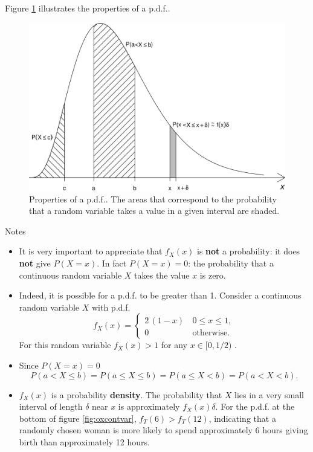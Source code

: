 \documentclass[
  11pt,
  british,
  openany, a4paper]{book}
\providecommand{\tightlist}{%
  \setlength{\itemsep}{0pt}\setlength{\parskip}{0pt}}
\begin{document}
Figure \ref{fig:pdfshady} illustrates the properties of a p.d.f..

\begin{figure}

{\centering \includegraphics[width=0.75\linewidth]{images/pdf_shady} 

}

\caption{Properties of a p.d.f.. The areas that correspond to the probability that a random variable takes a value in a given interval are shaded.}\label{fig:pdfshady}
\end{figure}

Notes

\begin{itemize}
\tightlist
\item
  It is very important to appreciate that \(f_X(x)\) is \textbf{not} a probability: it does \textbf{not} give \(P(X=x)\). In fact \(P(X=x)=0\): the probability that a continuous random variable \(X\) takes the value \(x\) is zero.
\item
  Indeed, it is possible for a p.d.f. to be greater than 1. Consider a continuous random variable \(X\) with p.d.f.
  \[ f_X(x) = \left\{ \begin{array}{ll} 2\,(1-x) & \,0 \leq x \leq 1, \\ 0 & \,\mbox{otherwise}.\end{array}\right. \]
  For this random variable \(f_X(x)>1\) for any \(x \in [0, 1/2)\) .
\item
  Since \(P(X=x)=0\)
  \[ P(a < X \leq b) = P(a \leq X \leq b) = P(a \leq X < b) = P(a < X < b). \]
\item
  \(f_X(x)\) is a probability \textbf{density}. The probability that \(X\) lies in a very small interval of length \(\delta\) near \(x\) is approximately \(f_X(x) \delta\). For the p.d.f. at the bottom of figure \ref{fig:oxcontvar}, \(f_T(6) > f_T(12)\), indicating that a randomly chosen woman is more likely to spend approximately 6 hours giving birth than approximately
  12 hours.
\end{itemize}
\end{document}
